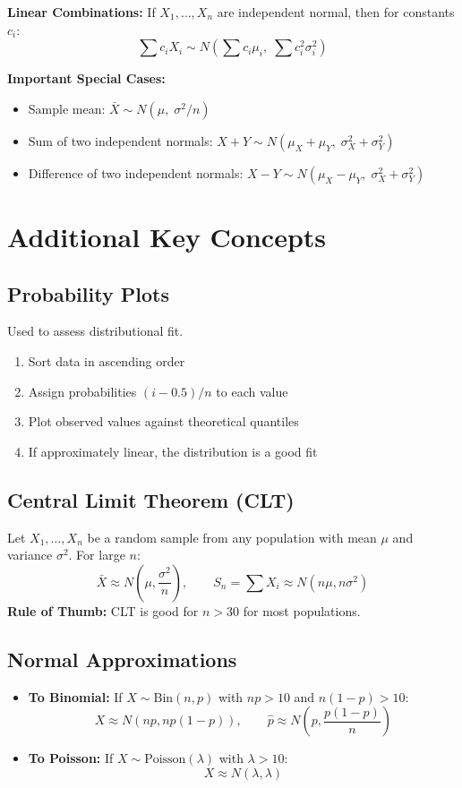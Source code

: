 \documentclass[11pt]{article}
\begin{document}
\textbf{Linear Combinations:}
If \(X_1,\dots,X_n\) are independent normal, then for constants \(c_i\):
\[
\sum c_i X_i \sim N\left(\sum c_i\mu_i,\; \sum c_i^2\sigma_i^2\right)
\]

\textbf{Important Special Cases:}
\begin{itemize}[nosep]
    \item Sample mean: \(\bar{X} \sim N(\mu,\; \sigma^2/n)\)
    \item Sum of two independent normals: \(X+Y \sim N(\mu_X+\mu_Y,\; \sigma_X^2+\sigma_Y^2)\)
    \item Difference of two independent normals: \(X-Y \sim N(\mu_X-\mu_Y,\; \sigma_X^2+\sigma_Y^2)\)
\end{itemize}

\section*{Additional Key Concepts}
\subsection*{Probability Plots}
Used to assess distributional fit.
\begin{enumerate}[nosep]
    \item Sort data in ascending order
    \item Assign probabilities \((i-0.5)/n\) to each value
    \item Plot observed values against theoretical quantiles
    \item If approximately linear, the distribution is a good fit
\end{enumerate}

\subsection*{Central Limit Theorem (CLT)}
Let \(X_1,\dots,X_n\) be a random sample from any population with mean \(\mu\) and variance \(\sigma^2\). For large \(n\):
\[
\bar{X} \approx N\left(\mu,\frac{\sigma^2}{n}\right),\qquad S_n = \sum X_i \approx N(n\mu, n\sigma^2)
\]
\textbf{Rule of Thumb:} CLT is good for \(n>30\) for most populations.

\subsection*{Normal Approximations}
\begin{itemize}[nosep]
    \item \textbf{To Binomial:} If \(X\sim\text{Bin}(n,p)\) with \(np>10\) and \(n(1-p)>10\):
    \[
    X \approx N(np, np(1-p)),\qquad \hat{p} \approx N\left(p,\frac{p(1-p)}{n}\right)
    \]
    \item \textbf{To Poisson:} If \(X\sim\text{Poisson}(\lambda)\) with \(\lambda>10\):
    \[
    X \approx N(\lambda, \lambda)
    \]
\end{itemize}
\end{document}
